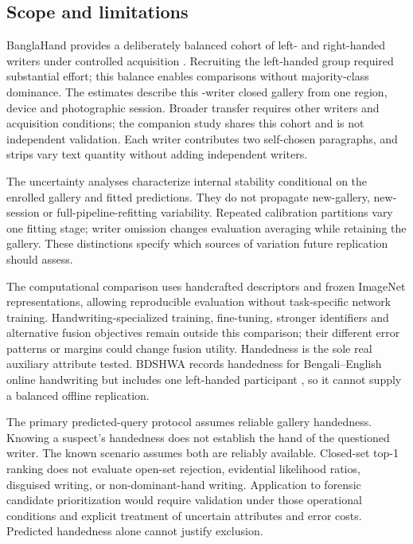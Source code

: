 \documentclass[5p,times,twocolumn,final,numbers,sort&compress]{elsarticle}
\begin{document}
\subsection{Scope and limitations}
BanglaHand provides a deliberately balanced cohort of \rLeft{} left- and \rLeft{} right-handed writers under controlled acquisition \cite{banglahand2026data}. Recruiting the left-handed group required substantial effort; this balance enables comparisons without majority-class dominance. The estimates describe this \rWriters{}-writer closed gallery from one region, device and photographic session. Broader transfer requires other writers and acquisition conditions; the companion study shares this cohort and is not independent validation. Each writer contributes two self-chosen paragraphs, and strips vary text quantity without adding independent writers.

The uncertainty analyses characterize internal stability conditional on the enrolled gallery and fitted predictions. They do not propagate new-gallery, new-session or full-pipeline-refitting variability. Repeated calibration partitions vary one fitting stage; writer omission changes evaluation averaging while retaining the gallery. These distinctions specify which sources of variation future replication should assess.

The computational comparison uses handcrafted descriptors and frozen ImageNet representations, allowing reproducible evaluation without task-specific network training. Handwriting-specialized training, fine-tuning, stronger identifiers and alternative fusion objectives remain outside this comparison; their different error patterns or margins could change fusion utility. Handedness is the sole real auxiliary attribute tested. BDSHWA records handedness for Bengali--English online handwriting but includes one left-handed participant \cite{bdshwa2026}, so it cannot supply a balanced offline replication.

The primary predicted-query protocol assumes reliable gallery handedness. Knowing a suspect's handedness does not establish the hand of the questioned writer. The known scenario assumes both are reliably available. Closed-set top-1 ranking does not evaluate open-set rejection, evidential likelihood ratios, disguised writing, or non-dominant-hand writing. Application to forensic candidate prioritization would require validation under those operational conditions and explicit treatment of uncertain attributes and error costs. Predicted handedness alone cannot justify exclusion.
\end{document}

